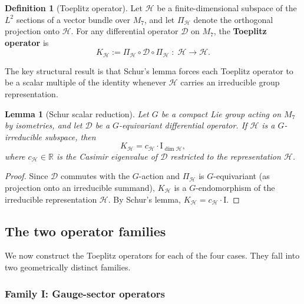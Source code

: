 \documentclass[11pt]{article}
\newtheorem{lemma}[theorem]{Lemma}
\theoremstyle{definition}
\newtheorem{definition}[theorem]{Definition}
\theoremstyle{remark}
\newcommand{\Id}{\mathrm{I}}
\begin{document}
\begin{definition}[Toeplitz operator]
\label{def:toeplitz}
Let $\mathcal{H}$ be a finite-dimensional subspace of the $L^2$ sections
of a vector bundle over $M_7$, and let $\Pi_{\mathcal{H}}$ denote the
orthogonal projection onto $\mathcal{H}$. For any differential operator
$\mathcal{D}$ on $M_7$, the \textbf{Toeplitz operator} is
\begin{equation}
\label{eq:toeplitz}
K_{\mathcal{H}} := \Pi_{\mathcal{H}} \circ \mathcal{D} \circ \Pi_{\mathcal{H}}
\;:\; \mathcal{H} \to \mathcal{H}.
\end{equation}
\end{definition}

The key structural result is that Schur's lemma forces each Toeplitz
operator to be a scalar multiple of the identity whenever $\mathcal{H}$
carries an irreducible group representation.

\begin{lemma}[Schur scalar reduction]
\label{lem:schur}
Let $G$ be a compact Lie group acting on $M_7$ by isometries, and let
$\mathcal{D}$ be a $G$-equivariant differential operator. If
$\mathcal{H}$ is a $G$-irreducible subspace, then
\begin{equation}
\label{eq:schur}
K_{\mathcal{H}} = c_{\mathcal{H}} \cdot \Id_{\dim \mathcal{H}},
\end{equation}
where $c_{\mathcal{H}} \in \mathbb{R}$ is the Casimir eigenvalue of
$\mathcal{D}$ restricted to the representation $\mathcal{H}$.
\end{lemma}

\begin{proof}
Since $\mathcal{D}$ commutes with the $G$-action and
$\Pi_{\mathcal{H}}$ is $G$-equivariant (as projection onto an
irreducible summand), $K_{\mathcal{H}}$ is a $G$-endomorphism of the
irreducible representation $\mathcal{H}$. By Schur's lemma,
$K_{\mathcal{H}} = c_{\mathcal{H}} \cdot \Id$.
\end{proof}

\subsection{The two operator families}

We now construct the Toeplitz operators for each of the four cases.
They fall into two geometrically distinct families.

\subsubsection{Family I: Gauge-sector operators}
\end{document}
